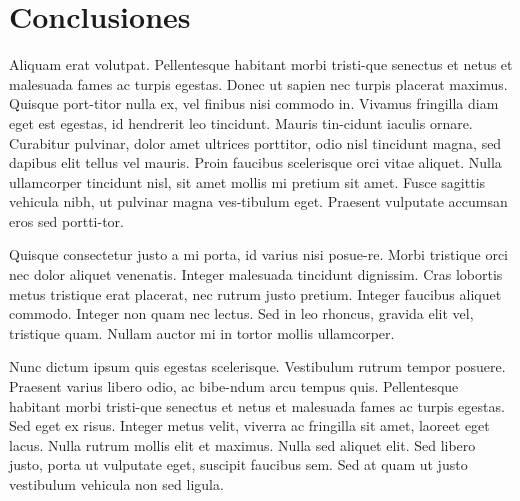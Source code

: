 \documentclass[10pt,a4paper,twocolumn,twoside]{article}
\begin{document}

\section{Conclusiones}

Aliquam erat volutpat. Pellentesque habitant morbi tristi-que senectus et netus et malesuada fames ac turpis egestas. Donec ut sapien nec turpis placerat maximus. Quisque port-titor nulla ex, vel finibus nisi commodo in. Vivamus fringilla diam eget est egestas, id hendrerit leo tincidunt. Mauris tin-cidunt iaculis ornare. Curabitur pulvinar, dolor amet ultrices porttitor, odio nisl tincidunt magna, sed dapibus elit tellus vel mauris. Proin faucibus scelerisque orci vitae aliquet. Nulla ullamcorper tincidunt nisl, sit amet mollis mi pretium sit amet. Fusce sagittis vehicula nibh, ut pulvinar magna ves-tibulum eget. Praesent vulputate accumsan eros sed portti-tor. 

Quisque consectetur justo a mi porta, id varius nisi posue-re. Morbi tristique orci nec dolor aliquet venenatis. Integer malesuada tincidunt dignissim. Cras lobortis metus tristique erat placerat, nec rutrum justo pretium. Integer faucibus aliquet commodo. Integer non quam nec lectus. Sed in leo rhoncus, gravida elit vel, tristique quam. Nullam auctor mi in tortor mollis ullamcorper. 

Nunc dictum ipsum quis egestas scelerisque. Vestibulum rutrum tempor posuere. Praesent varius libero odio, ac bibe-ndum arcu tempus quis. Pellentesque habitant morbi tristi-que senectus et netus et malesuada fames ac turpis egestas. Sed eget ex risus. Integer metus velit, viverra ac fringilla sit amet, laoreet eget lacus. Nulla rutrum mollis elit et maximus. Nulla sed aliquet elit. Sed libero justo, porta ut vulputate eget, suscipit faucibus sem. Sed at quam ut justo vestibulum vehicula non sed ligula. 
\end{document}
